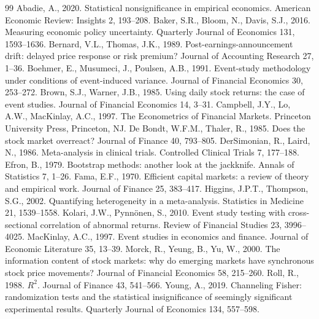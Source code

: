 \documentclass[12pt]{article}
\begin{document}
\begin{thebibliography}{99}
 Abadie, A., 2020. Statistical nonsignificance in empirical
economics. American Economic Review: Insights 2, 193--208.
 Baker, S.R., Bloom, N., Davis, S.J., 2016. Measuring
economic policy uncertainty. Quarterly Journal of Economics 131, 1593--1636.
 Bernard, V.L., Thomas, J.K., 1989.
Post-earnings-announcement drift: delayed price response or risk premium? Journal of Accounting
Research 27, 1--36.
 Boehmer, E., Musumeci, J., Poulsen, A.B., 1991.
Event-study methodology under conditions of event-induced variance. Journal of Financial Economics
30, 253--272.
 Brown, S.J., Warner, J.B., 1985. Using daily stock
returns: the case of event studies. Journal of Financial Economics 14, 3--31.
 Campbell, J.Y., Lo, A.W., MacKinlay, A.C., 1997. The
Econometrics of Financial Markets. Princeton University Press, Princeton, NJ.
 De Bondt, W.F.M., Thaler, R., 1985. Does the stock
market overreact? Journal of Finance 40, 793--805.
 DerSimonian, R., Laird, N., 1986.
Meta-analysis in clinical trials. Controlled Clinical Trials 7, 177--188.
 Efron, B., 1979. Bootstrap methods: another look at the jackknife.
Annals of Statistics 7, 1--26.
 Fama, E.F., 1970. Efficient capital markets: a review of theory and
empirical work. Journal of Finance 25, 383--417.
 Higgins, J.P.T., Thompson, S.G., 2002. Quantifying
heterogeneity in a meta-analysis. Statistics in Medicine 21, 1539--1558.
 Kolari, J.W., Pynn\"onen, S., 2010. Event study
testing with cross-sectional correlation of abnormal returns. Review of Financial Studies 23,
3996--4025.
 MacKinlay, A.C., 1997. Event studies in economics and
finance. Journal of Economic Literature 35, 13--39.
 Morck, R., Yeung, B., Yu, W., 2000. The information content
of stock markets: why do emerging markets have synchronous stock price movements? Journal of
Financial Economics 58, 215--260.
 Roll, R., 1988. $R^2$. Journal of Finance 43, 541--566.
 Young, A., 2019. Channeling Fisher: randomization tests and the
statistical insignificance of seemingly significant experimental results. Quarterly Journal of
Economics 134, 557--598.
\end{thebibliography}
\end{document}
